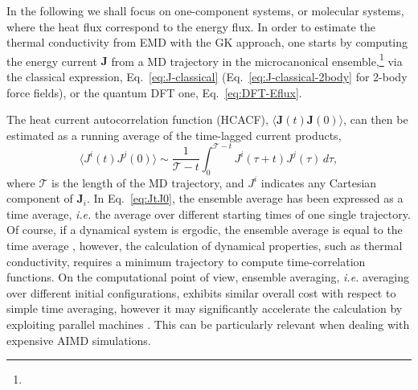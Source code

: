 \begin{LEtext}
In the following we shall focus on one-component systems, or molecular systems, where the heat flux correspond to the energy flux. 
In order to estimate the thermal conductivity from EMD with the GK approach, one starts by computing the energy current $\mathbf{J}$ from a MD trajectory in the microcanonical ensemble,\footnote{} 
via the classical expression, Eq.~\eqref{eq:J-classical} (Eq.~\eqref{eq:J-classical-2body} for 2-body force fields), or the quantum DFT one, Eq.~\eqref{eq:DFT-Eflux}.

The heat current autocorrelation function (HCACF), $\langle\mathbf{J}(t)\mathbf{J}(0)\rangle$, can then be estimated as a running average of the time-lagged current products, 
\begin{equation}
    \langle J^i(t) J^j(0)\rangle \sim \frac{1}{\mathcal{T}-t} \int_0^{\mathcal{T}-t} J^i(\tau+t) J^j(\tau) \, d\tau , \label{eq:JtJ0}
\end{equation}
where $\mathcal{T}$ is the length of the MD trajectory, and $J^i$ indicates any Cartesian component of $\mathbf{J}_i$. 
In Eq.~\eqref{eq:JtJ0}, the ensemble average has been expressed as a time average, \emph{i.e.} the average over different starting times of one single trajectory. Of course, if a dynamical system is ergodic, the ensemble average is equal to the time average \cite{Frenkel2001}, however, the calculation of dynamical properties, such as thermal conductivity, requires a minimum trajectory to compute time-correlation functions. On the computational point of view, ensemble averaging, \emph{i.e.} averaging over different initial configurations, exhibits similar overall cost with respect to simple time averaging, however it may significantly accelerate the calculation by exploiting parallel machines \cite{Gordiz2015}. This can be particularly relevant when dealing with expensive AIMD simulations.



\end{LEtext}

